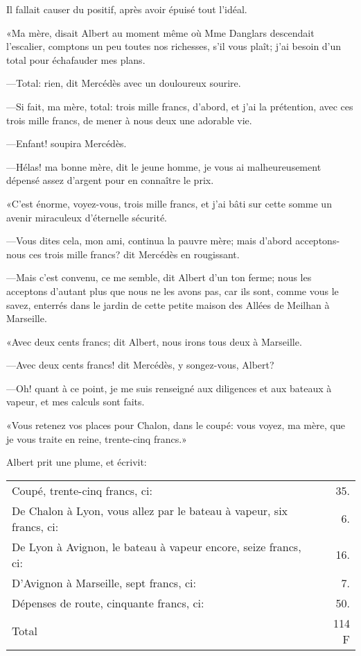 Il fallait causer du positif, après avoir épuisé tout l'idéal. 

«Ma mère, disait Albert au moment même où Mme Danglars descendait l'escalier, comptons un peu toutes nos richesses, s'il vous plaît; j'ai besoin d'un total pour échafauder mes plans. 

—Total: rien, dit Mercédès avec un douloureux sourire. 

—Si fait, ma mère, total: trois mille francs, d'abord, et j'ai la prétention, avec ces trois mille francs, de mener à nous deux une adorable vie. 

—Enfant! soupira Mercédès. 

—Hélas! ma bonne mère, dit le jeune homme, je vous ai malheureusement dépensé assez d'argent pour en connaître le prix. 

«C'est énorme, voyez-vous, trois mille francs, et j'ai bâti sur cette somme un avenir miraculeux d'éternelle sécurité. 

—Vous dites cela, mon ami, continua la pauvre mère; mais d'abord acceptons-nous ces trois mille francs? dit Mercédès en rougissant. 

—Mais c'est convenu, ce me semble, dit Albert d'un ton ferme; nous les acceptons d'autant plus que nous ne les avons pas, car ils sont, comme vous le savez, enterrés dans le jardin de cette petite maison des Allées de Meilhan à Marseille. 

«Avec deux cents francs; dit Albert, nous irons tous deux à Marseille. 

—Avec deux cents francs! dit Mercédès, y songez-vous, Albert? 

—Oh! quant à ce point, je me suis renseigné aux diligences et aux bateaux à vapeur, et mes calculs sont faits. 

«Vous retenez vos places pour Chalon, dans le coupé: vous voyez, ma mère, que je vous traite en reine, trente-cinq francs.» 

Albert prit une plume, et écrivit: 

 \begin{tabular} {l@{\dotfill}r} 
 
Coupé, trente-cinq francs, ci:&35.\\
De Chalon à Lyon, vous allez par le bateau à vapeur, six francs, ci:&6.\\
De Lyon à Avignon, le bateau à vapeur encore, seize francs, ci:&16.\\
D'Avignon à Marseille, sept francs, ci:&7.\\
Dépenses de route, cinquante francs, ci:&50.\\
Total&114 F\\
\end{tabular}
\bigskip



